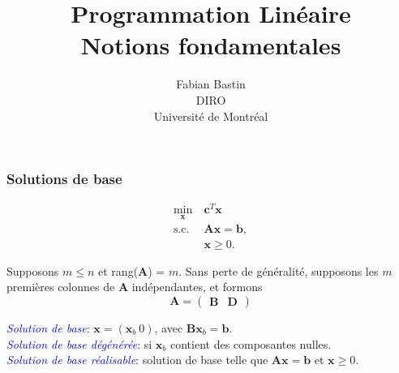 \documentclass[usepdftitle=false]{beamer}
\title[Notions fondamentales]{Programmation Linéaire\\Notions fondamentales}
\author[Fabian Bastin]{Fabian Bastin\\DIRO\\Université de Montréal}
\date{}
\def\bb{\boldsymbol{b}}
\def\bc{\boldsymbol{c}}
\def\bx{\boldsymbol{x}}
\def\bA{\boldsymbol{A}}
\def\bB{\boldsymbol{B}}
\def\bD{\boldsymbol{D}}
\begin{document}
\frame{\titlepage}

\begin{frame}


\frametitle{Solutions de base}

\begin{align*}
\min_{\bx}\ & \bc^T \bx \\
\mbox{s.c. } & \bA \bx = \bb, \\
 & \bx \geq 0.
\end{align*}

\mbox{}

Supposons $m \leq n$ et rang($\bA$) = $m$.
Sans perte de généralité, supposons les $m$ premières colonnes de $\bA$ indépendantes, et formons
\[
\bA =
\begin{pmatrix}
 \bB & \bD
\end{pmatrix}
\]

\mbox{}

{\it \textcolor{blue}{Solution de base}}: $\bx = (\bx_b \ 0)$, avec $\bB\bx_b = \bb$.\\
{\it \textcolor{blue}{Solution de base dégénérée}}: si $\bx_b$ contient des composantes nulles. \\
{\it \textcolor{blue}{Solution de base réalisable}}: solution de base telle que $\bA\bx = \bb$ et $\bx \geq 0$.
\end{frame}
\end{document}
